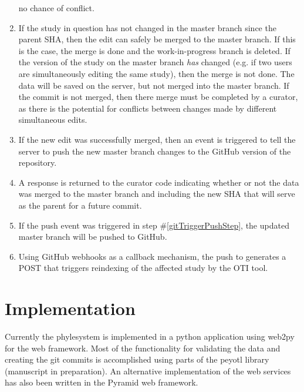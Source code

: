 \documentclass{bioinfo}
\newcommand{\ps}{phylesystem\xspace}
\begin{document}
\begin{methods}
\begin{enumerate}
        no chance of conflict.
    \item \label{gitMergeStep} If the study in question has not changed in the master branch 
        since the parent SHA, then the edit can safely be merged to the master branch.
        If this is the case, the merge is done and the work-in-progress branch is deleted.
        If the version of the study on the master branch {\em has} changed (e.g. if two users are simultaneously editing the same study),
        then the merge is not done. The data will be saved on the server, but not merged into the master branch.
        If the commit is not merged, then there merge must be completed by a curator, as there is the potential for conflicts between changes made by different simultaneous edits.
    \item\label{gitTriggerPushStep}  If the new edit was successfully merged, then an event is triggered to tell the server to push the new master branch changes to the GitHub version
        of the repository.
    \item\label{respondStep} A response is returned to the curator code indicating whether or not the data was 
        merged to the master branch and including the new SHA that will serve as the parent for a future commit.
    \item\label{pushStep}  If the push event was triggered in step \#\ref{gitTriggerPushStep}, the updated master branch will be pushed to GitHub.
    \item\label{webHookStep} Using GitHub webhooks as a callback mechanism, the push to generates a POST that triggers reindexing
        of the affected study by the OTI tool.
\end{enumerate}

\section{Implementation}
Currently the \ps is implemented in a python application using web2py for the web framework.
Most of the functionality for validating the data and creating the git commits is accomplished using
    parts of the peyotl library (manuscript in preparation).
An alternative implementation of the web services has also been written in the Pyramid
    web framework.


\end{methods}
\end{document}
